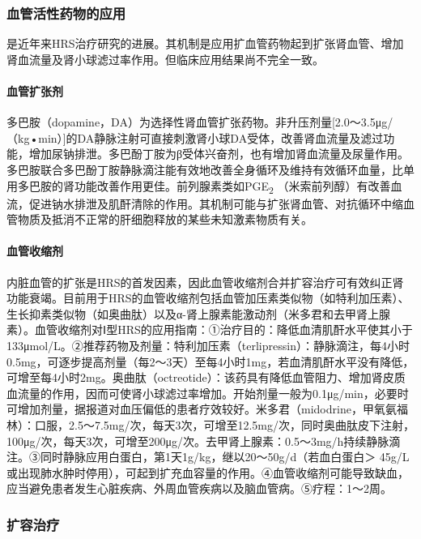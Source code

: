 \subsubsection{血管活性药物的应用}

是近年来HRS治疗研究的进展。其机制是应用扩血管药物起到扩张肾血管、增加肾血流量及肾小球滤过率作用。但临床应用结果尚不完全一致。

\paragraph{血管扩张剂}

多巴胺（dopamine，DA）为选择性肾血管扩张药物。非升压剂量{[}2.0～3.5μg/（kg•min）{]}的DA静脉注射可直接刺激肾小球DA受体，改善肾血流量及滤过功能，增加尿钠排泄。多巴酚丁胺为β受体兴奋剂，也有增加肾血流量及尿量作用。多巴胺联合多巴酚丁胺静脉滴注能有效地改善全身循环及维持有效循环血量，比单用多巴胺的肾功能改善作用更佳。前列腺素类如PGE\textsubscript{2}
（米索前列醇）有改善血流，促进钠水排泄及肌酐清除的作用。其机制可能与扩张肾血管、对抗循环中缩血管物质及抵消不正常的肝细胞释放的某些未知激素物质有关。

\paragraph{血管收缩剂}

内脏血管的扩张是HRS的首发因素，因此血管收缩剂合并扩容治疗可有效纠正肾功能衰竭。目前用于HRS的血管收缩剂包括血管加压素类似物（如特利加压素）、生长抑素类似物（如奥曲肽）以及α-肾上腺素能激动剂（米多君和去甲肾上腺素）。血管收缩剂对Ⅰ型HRS的应用指南：①治疗目的：降低血清肌酐水平使其小于133μmol/L。②推荐药物及剂量：特利加压素（terlipressin）：静脉滴注，每4小时0.5mg，可逐步提高剂量（每2～3天）至每4小时1mg，若血清肌酐水平没有降低，可增至每4小时2mg。奥曲肽（octreotide）：该药具有降低血管阻力、增加肾皮质血流量的作用，因而可使肾小球滤过率增加。开始剂量一般为0.1μg/min，必要时可增加剂量，据报道对血压偏低的患者疗效较好。米多君（midodrine，甲氧氨福林）：口服，2.5～7.5mg/次，每天3次，可增至12.5mg/次，同时奥曲肽皮下注射，100μg/次，每天3次，可增至200μg/次。去甲肾上腺素：0.5～3mg/h持续静脉滴注。③同时静脉应用白蛋白，第1天1g/kg，继以20～50g/d（若血白蛋白＞
45g/L或出现肺水肿时停用），可起到扩充血容量的作用。④血管收缩剂可能导致缺血，应当避免患者发生心脏疾病、外周血管疾病以及脑血管病。⑤疗程：1～2周。

\subsubsection{扩容治疗}

